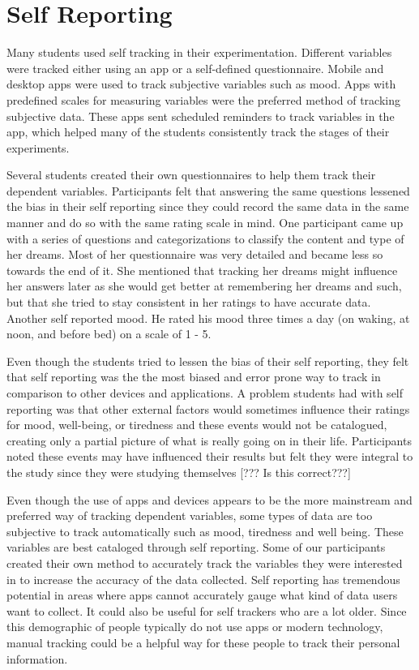 \section{Self Reporting}
Many students used self tracking in their experimentation. Different variables were tracked either using an app or a self-defined questionnaire. Mobile and desktop apps were used to track subjective variables such as mood. Apps with predefined scales for measuring variables were the preferred method of tracking subjective data. These apps sent scheduled reminders to track variables in the app, which helped many of the students consistently track the stages of their experiments. 

Several students created their own questionnaires to help them track their dependent variables. 
Participants felt that answering the same questions lessened the bias in their self reporting since they could record the same data in the same manner and do so with the same rating scale in mind. One participant came up with a series of questions and categorizations to classify the content and type of her dreams. Most of her questionnaire was very detailed and became less so towards the end of it. She mentioned that tracking her dreams might influence her answers later as she would get better at remembering her dreams and such, but that she tried to stay consistent in her ratings to have accurate data. Another self reported mood. He rated his mood three times a day (on waking, at noon, and before bed) on a scale of 1 - 5. 

Even though the students tried to lessen the bias of their self reporting, they felt that self reporting was the the most biased and error prone way to track in comparison to other devices and applications. A problem students had with self reporting was that other external factors would sometimes influence their ratings for mood, well-being, or tiredness and these events would not be catalogued, creating only a partial picture of what is really going on in their life. Participants noted these events may have influenced their results but felt they were integral to the study since they were studying themselves [??? Is this correct???]

Even though the use of apps and devices appears to be the more mainstream and preferred way of tracking dependent variables, some types of data are too subjective to track automatically such as mood, tiredness and well being. These variables are best cataloged through self reporting. Some of our participants created their own method to accurately track the variables they were interested in to increase the accuracy of the data collected. Self reporting has tremendous potential in areas where apps cannot accurately gauge what kind of data users want to collect. It could also be useful for self trackers who are a lot older. Since this demographic of people typically do not use apps or modern technology, manual tracking could be a helpful way for these people to track their personal information. 

